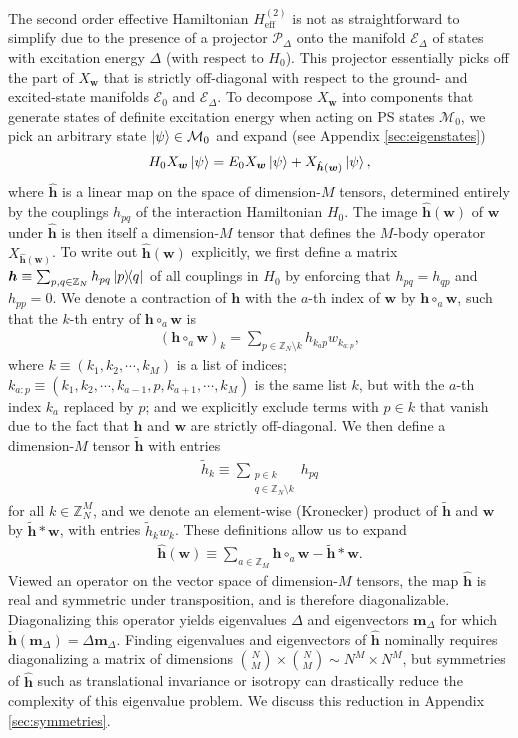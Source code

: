 \documentclass[nofootinbib,notitlepage,11pt]{revtex4-2}
\renewcommand{\t}{\text} %
\newcommand{\p}[1]{\left(#1\right)} %
\newcommand{\m}{\bm} %
\newcommand{\1}{\mathds{1}}
\newcommand{\E}{\mathcal{E}}
\newcommand{\M}{\mathcal{M}}
\renewcommand{\P}{\mathcal{P}}
\newcommand{\ZZ}{\mathbb{Z}}
\begin{document}
The second order effective Hamiltonian $H_{\t{eff}}^{(2)}$ is not as
straightforward to simplify due to the presence of a projector
$\P_\Delta$ onto the manifold $\E_\Delta$ of states with excitation
energy $\Delta$ (with respect to $H_0$).  This projector essentially
picks off the part of $X_{\m w}$ that is strictly off-diagonal with
respect to the ground- and excited-state manifolds $\E_0$ and
$\E_\Delta$.  To decompose $X_{\m w}$ into components that generate
states of definite excitation energy when acting on PS states $\M_0$,
we pick an arbitrary state $\ket\psi\in\M_0$ and expand (see Appendix
\ref{sec:eigenstates})
\begin{align}
  H_0 X_{\m w} \ket\psi
  = E_0 X_{\m w} \ket\psi + X_{\hat{\m h}\p{\m w}} \ket\psi,
  \label{eq:diagnosis}
\end{align}
where $\hat{\m h}$ is a linear map on the space of dimension-$M$
tensors, determined entirely by the couplings $h_{pq}$ of the
interaction Hamiltonian $H_0$.  The image $\hat{\m h}\p{\m w}$ of
$\m w$ under $\hat{\m h}$ is then itself a dimension-$M$ tensor that
defines the $M$-body operator $X_{\hat{\m h}\p{\m w}}$.  To write out
$\hat{\m h}\p{\m w}$ explicitly, we first define a matrix
$\m h\equiv\sum_{p,q\in\ZZ_N} h_{pq} \op{p}{q}$ of all couplings in
$H_0$ by enforcing that $h_{pq}=h_{qp}$ and $h_{pp}=0$.  We denote a
contraction of $\m h$ with the $a$-th index of $\m w$ by
$\m h \circ_a\m w$, such that the $k$-th entry of $\m h \circ_a\m w$
is
\begin{align}
  \p{\m h \circ_a \m w}_k
  = \sum_{p\in\ZZ_N\setminus k} h_{k_a p} w_{k_{a:p}},
\end{align}
where $k\equiv\p{k_1,k_2,\cdots,k_M}$ is a list of indices;
$k_{a:p}\equiv\p{k_1,k_2,\cdots,k_{a-1},p,k_{a+1},\cdots,k_M}$ is the
same list $k$, but with the $a$-th index $k_a$ replaced by $p$; and we
explicitly exclude terms with $p\in k$ that vanish due to the fact
that $\m h$ and $\m w$ are strictly off-diagonal.  We then define a
dimension-$M$ tensor $\tilde{\m h}$ with entries
\begin{align}
  \tilde h_k \equiv \sum_{\substack{p\in k\\q\in\ZZ_N\setminus k}} h_{pq}
\end{align}
for all $k\in\ZZ_N^M$, and we denote an element-wise (Kronecker)
product of $\tilde{\m h}$ and $\m w$ by $\tilde{\m h} * \m w$, with
entries $\tilde h_k w_k$.  These definitions allow us to expand
\begin{align}
  \hat{\m h}\p{\m w}
  \equiv \sum_{a\in\ZZ_M} \m h \circ_a \m w - \tilde{\m h} * \m w.
\end{align}
Viewed an operator on the vector space of dimension-$M$ tensors, the
map $\hat{\m h}$ is real and symmetric under transposition, and is
therefore diagonalizable.  Diagonalizing this operator yields
eigenvalues $\Delta$ and eigenvectors $\m m_\Delta$ for which
$\check{\m h}\p{\m m_\Delta}=\Delta\m m_\Delta$.  Finding eigenvalues
and eigenvectors of $\hat{\m h}$ nominally requires diagonalizing a
matrix of dimensions
${N\choose M}\times{N\choose M}\sim N^M\times N^M$, but symmetries of
$\hat{\m h}$ such as translational invariance or isotropy can
drastically reduce the complexity of this eigenvalue problem.  We
discuss this reduction in Appendix \ref{sec:symmetries}.
\end{document}
